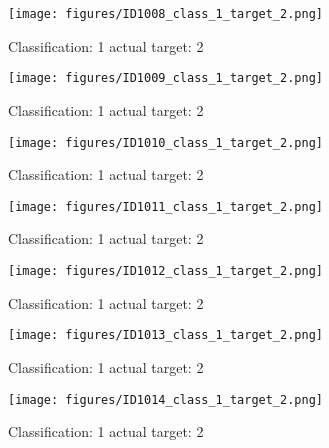 \begin{figure}[h!]
\begin{center}
\texttt{[image: figures/ID1008\_class\_1\_target\_2.png]}
\end{center}
\caption{ Classification: 1 actual target: 2}
\label{fig:ID1008_class_1_target_2}
\end{figure}
\begin{figure}[h!]
\begin{center}
\texttt{[image: figures/ID1009\_class\_1\_target\_2.png]}
\end{center}
\caption{ Classification: 1 actual target: 2}
\label{fig:ID1009_class_1_target_2}
\end{figure}
\begin{figure}[h!]
\begin{center}
\texttt{[image: figures/ID1010\_class\_1\_target\_2.png]}
\end{center}
\caption{ Classification: 1 actual target: 2}
\label{fig:ID1010_class_1_target_2}
\end{figure}
\begin{figure}[h!]
\begin{center}
\texttt{[image: figures/ID1011\_class\_1\_target\_2.png]}
\end{center}
\caption{ Classification: 1 actual target: 2}
\label{fig:ID1011_class_1_target_2}
\end{figure}
\begin{figure}[h!]
\begin{center}
\texttt{[image: figures/ID1012\_class\_1\_target\_2.png]}
\end{center}
\caption{ Classification: 1 actual target: 2}
\label{fig:ID1012_class_1_target_2}
\end{figure}
\begin{figure}[h!]
\begin{center}
\texttt{[image: figures/ID1013\_class\_1\_target\_2.png]}
\end{center}
\caption{ Classification: 1 actual target: 2}
\label{fig:ID1013_class_1_target_2}
\end{figure}
\begin{figure}[h!]
\begin{center}
\texttt{[image: figures/ID1014\_class\_1\_target\_2.png]}
\end{center}
\caption{ Classification: 1 actual target: 2}
\label{fig:ID1014_class_1_target_2}
\end{figure}
